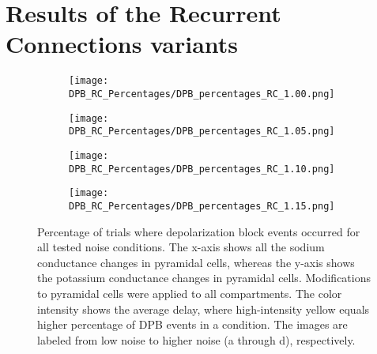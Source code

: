 \section{Results of the Recurrent Connections variants}
\begin{figure}[H]
    \centering
    \begin{subfigure}{0.48\textwidth}
        \texttt{[image: DPB\_RC\_Percentages/DPB\_percentages\_RC\_1.00.png]}
        \caption{} %
    \end{subfigure}\hfill
    \begin{subfigure}{0.48\textwidth}
        \texttt{[image: DPB\_RC\_Percentages/DPB\_percentages\_RC\_1.05.png]}
        \caption{} %
    \end{subfigure}

    \bigskip %

    \begin{subfigure}{0.48\textwidth}
        \texttt{[image: DPB\_RC\_Percentages/DPB\_percentages\_RC\_1.10.png]}
        \caption{} %
    \end{subfigure}\hfill
    \begin{subfigure}{0.48\textwidth}
        \texttt{[image: DPB\_RC\_Percentages/DPB\_percentages\_RC\_1.15.png]}
        \caption{} %
    \end{subfigure}

    \caption[RC DPB percentage matrices (all)]{Percentage of trials where depolarization block events occurred for all tested noise conditions.
        The x-axis shows all the sodium conductance changes in pyramidal cells, whereas the y-axis shows the potassium conductance changes in pyramidal cells.
        Modifications to pyramidal cells were applied to all compartments.
        The color intensity shows the average delay, where high-intensity yellow equals higher percentage of DPB events in a condition.
        The images are labeled from low noise to higher noise (a through d), respectively.}\label{fig:rc_dpb_percentage_matrices}
\end{figure}